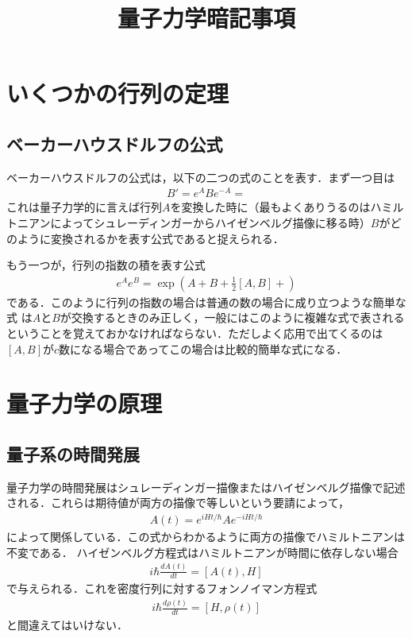 \documentclass[a4j]{jarticle}
\title{量子力学暗記事項}
\begin{document}
\maketitle

\section{いくつかの行列の定理}

\subsection{ベーカーハウスドルフの公式}
ベーカーハウスドルフの公式は，以下の二つの式のことを表す．まず一つ目は
\begin{align*}
B'=e^{A}Be^{-A}=
\end{align*}
これは量子力学的に言えば行列$A$を変換した時に（最もよくありうるのはハミルトニアンによってシュレーディンガーからハイゼンベルグ描像に移る時）$B$がどのように変換されるかを表す公式であると捉えられる．

もう一つが，行列の指数の積を表す公式
\begin{align*}
 e^{A}e^{B}=\exp\left(A+B+\frac{1}{2}[A,B]+\right)
\end{align*}
である．このように行列の指数の場合は普通の数の場合に成り立つような簡単な式
は$A$と$B$が交換するときのみ正しく，一般にはこのように複雑な式で表されるということを覚えておかなければならない．ただしよく応用で出てくるのは$[A,B]$が$c$数になる場合であってこの場合は比較的簡単な式になる．


\section{量子力学の原理}
\subsection{量子系の時間発展}
量子力学の時間発展はシュレーディンガー描像またはハイゼンベルグ描像で記述される．これらは期待値が両方の描像で等しいという要請によって，
\begin{align*}
 A(t)=e^{iHt/\hbar}Ae^{-iHt/\hbar}
\end{align*}
によって関係している．この式からわかるように両方の描像でハミルトニアンは不変である．
ハイゼンベルグ方程式はハミルトニアンが時間に依存しない場合
\begin{align*}
 i\hbar\frac{dA(t)}{dt}=[A(t),H]
\end{align*}
で与えられる．これを密度行列に対するフォンノイマン方程式
\begin{align*}
  i\hbar\frac{d\rho(t)}{dt}=[H,\rho(t)]
\end{align*}
と間違えてはいけない．
\end{document}
